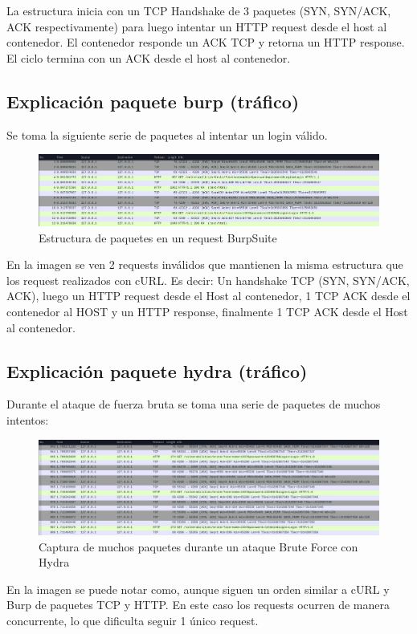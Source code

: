\documentclass[letter,12pt]{article}
\begin{document}
La estructura inicia con un TCP Handshake de 3 paquetes (SYN, SYN/ACK, ACK
respectivamente) para luego intentar un HTTP request desde el host al
contenedor. El contenedor responde un ACK TCP y retorna un HTTP response. El
ciclo termina con un ACK desde el host al contenedor.

\subsection{Explicación paquete burp (tráfico)}
Se toma la siguiente serie de paquetes al intentar un login válido.

\begin{figure}[H]
  \centering
  \includegraphics[width=16.5cm]{images/15-burp-packets.png}
  \caption{Estructura de paquetes en un request BurpSuite}
\end{figure}

En la imagen se ven 2 requests inválidos que mantienen la misma estructura que
los request realizados con cURL. Es decir: Un handshake TCP (SYN, SYN/ACK, ACK),
luego un HTTP request desde el Host al contenedor, 1 TCP ACK desde el contenedor
al HOST y un HTTP response, finalmente 1 TCP ACK desde el Host al contenedor.
\subsection{Explicación paquete hydra (tráfico)}
Durante el ataque de fuerza bruta se toma una serie de paquetes de muchos
intentos:

\begin{figure}[H]
  \centering
  \includegraphics[width=16.5cm]{images/21-hydra-packets.png}
  \caption{Captura de muchos paquetes durante un ataque Brute Force con Hydra}
\end{figure}

En la imagen se puede notar como, aunque siguen un orden similar a cURL y Burp
de paquetes TCP y HTTP. En este caso los requests ocurren de manera concurrente,
lo que dificulta seguir 1 único request.
\end{document}
